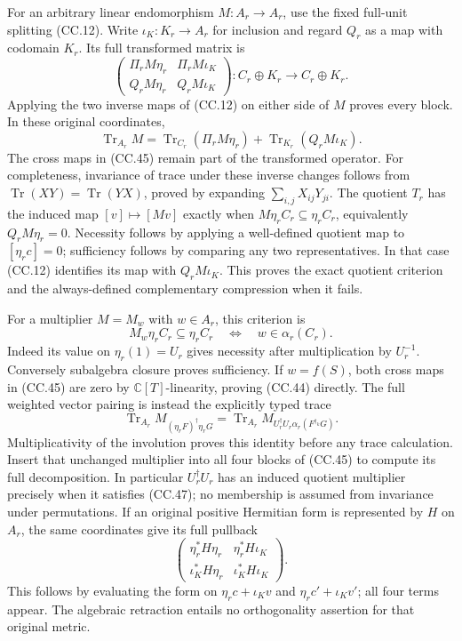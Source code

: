 For an arbitrary linear endomorphism \(M:A_r\to A_r\), use the
fixed full-unit splitting (CC.12).  Write
\(\iota_K:K_r\to A_r\) for inclusion and regard \(Q_r\) as a
map with codomain \(K_r\).  Its full transformed matrix is
\[
 \begin{pmatrix}
  \Pi_rM\eta_r&\Pi_rM\iota_K\\
  Q_rM\eta_r&Q_rM\iota_K
 \end{pmatrix}:C_r\oplus K_r\longrightarrow C_r\oplus K_r.
 \tag{CC.45}
\]
Applying the two inverse maps of (CC.12) on either side of \(M\)
proves every block.  In these original coordinates,
\[
 \operatorname{Tr}_{A_r}M
   =\operatorname{Tr}_{C_r}(\Pi_rM\eta_r)
       +\operatorname{Tr}_{K_r}(Q_rM\iota_K).
 \tag{CC.46}
\]
The cross maps in (CC.45) remain part of the transformed operator.
For completeness, invariance of trace under these inverse changes
follows from \(\operatorname{Tr}(XY)=\operatorname{Tr}(YX)\),
proved by expanding \(\sum_{i,j}X_{ij}Y_{ji}\).
The quotient \(T_r\) has the induced map \([v]\mapsto[Mv]\)
exactly when \(M\eta_rC_r\subseteq\eta_rC_r\), equivalently
\(Q_rM\eta_r=0\).  Necessity follows by applying a well-defined
quotient map to \([\eta_rc]=0\); sufficiency follows by comparing
any two representatives.  In that case (CC.12) identifies its
map with \(Q_rM\iota_K\).  This proves the exact quotient criterion
and the always-defined complementary compression when it fails.

For a multiplier \(M=M_w\) with \(w\in A_r\), this criterion is
\[
 M_w\eta_rC_r\subseteq\eta_rC_r
       \quad\Longleftrightarrow\quad w\in\alpha_r(C_r).
 \tag{CC.47}
\]
Indeed its value on \(\eta_r(1)=U_r\) gives necessity after
multiplication by \(U_r^{-1}\).  Conversely subalgebra closure
proves sufficiency.  If \(w=f(S)\), both cross maps in (CC.45)
are zero by \(\mathbb C[T]\)-linearity, proving (CC.44) directly.
The full weighted vector pairing is instead the explicitly typed
trace
\[
 \operatorname{Tr}_{A_r}M_{(\eta_rF)^\dagger\eta_rG}
   =\operatorname{Tr}_{A_r}
      M_{U_r^\dagger U_r\alpha_r(F^{\dagger_k}G)}.
 \tag{CC.48}
\]
Multiplicativity of the involution proves this identity before any
trace calculation.  Insert that unchanged multiplier into all four
blocks of (CC.45) to compute its full decomposition.  In particular
\(U_r^\dagger U_r\) has an induced quotient multiplier precisely
when it satisfies (CC.47); no membership is assumed from invariance
under permutations.  If an original positive Hermitian form is
represented by \(H\) on \(A_r\), the same coordinates give its
full pullback
\[
 \begin{pmatrix}
 \eta_r^*H\eta_r&\eta_r^*H\iota_K\\
 \iota_K^*H\eta_r&\iota_K^*H\iota_K
 \end{pmatrix}.
 \tag{CC.49}
\]
This follows by evaluating the form on
\(\eta_rc+\iota_Kv\) and \(\eta_rc'+\iota_Kv'\);
all four terms appear.  The algebraic retraction entails no
orthogonality assertion for that original metric.

